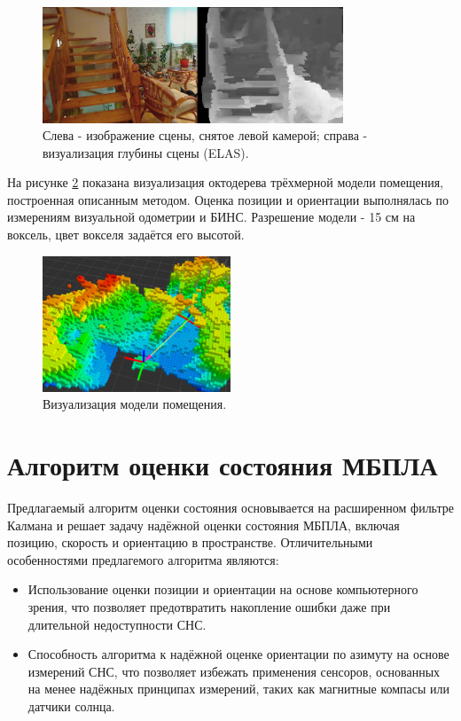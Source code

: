 \documentclass[12pt,a4paper]{article}
\begin{document}
\begin{figure}[!htbp]
    \centering
    \includegraphics[width=0.8\textwidth]{disparity.jpg}
    \caption{\label{fig:disparity}Слева - изображение сцены, снятое левой камерой; справа - визуализация глубины сцены (ELAS).}
\end{figure}

На рисунке \ref{fig:octomap} показана визуализация октодерева трёхмерной модели помещения, построенная описанным методом. Оценка позиции и ориентации выполнялась по измерениям визуальной одометрии и БИНС. Разрешение модели - 15 см на воксель, цвет вокселя задаётся его высотой.

\begin{figure}[!htbp]
    \centering
    \includegraphics[width=0.5\textwidth]{octomap.png}
    \caption{\label{fig:octomap}Визуализация модели помещения.}
\end{figure}

\section{Алгоритм оценки состояния МБПЛА}

Предлагаемый алгоритм оценки состояния основывается на расширенном фильтре Калмана и решает задачу надёжной оценки состояния МБПЛА, включая позицию, скорость и ориентацию в пространстве. Отличительными особенностями предлагемого алгоритма являются:

\begin{itemize}
    \item Использование оценки позиции и ориентации на основе компьютерного зрения, что позволяет предотвратить накопление ошибки даже при длительной недоступности СНС.
    \item Способность алгоритма к надёжной оценке ориентации по азимуту на основе измерений СНС, что позволяет избежать применения сенсоров, основанных на менее надёжных принципах измерений, таких как магнитные компасы или датчики солнца.
\end{itemize}
\end{document}
